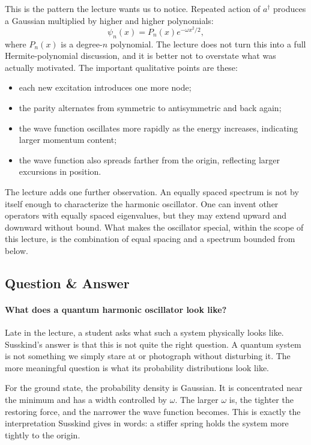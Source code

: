 This is the pattern the lecture wants us to notice. Repeated action of \(a^{\dagger}\) produces a Gaussian multiplied by higher and higher polynomials:
\begin{equation}
\psi_{n}(x)=P_{n}(x)e^{-\omega x^{2}/2},
\end{equation}
where \(P_{n}(x)\) is a degree-\(n\) polynomial. The lecture does not turn this into a full Hermite-polynomial discussion, and it is better not to overstate what was actually motivated. The important qualitative points are these:
\begin{itemize}
\item each new excitation introduces one more node;
\item the parity alternates from symmetric to antisymmetric and back again;
\item the wave function oscillates more rapidly as the energy increases, indicating larger momentum content;
\item the wave function also spreads farther from the origin, reflecting larger excursions in position.
\end{itemize}

The lecture adds one further observation. An equally spaced spectrum is not by itself enough to characterize the harmonic oscillator. One can invent other operators with equally spaced eigenvalues, but they may extend upward and downward without bound. What makes the oscillator special, within the scope of this lecture, is the combination of equal spacing and a spectrum bounded from below.

\subsection{Question \& Answer}

\paragraph{What does a quantum harmonic oscillator look like?}

Late in the lecture, a student asks what such a system physically looks like. Susskind's answer is that this is not quite the right question. A quantum system is not something we simply stare at or photograph without disturbing it. The more meaningful question is what its probability distributions look like.

For the ground state, the probability density is Gaussian. It is concentrated near the minimum and has a width controlled by \(\omega\). The larger \(\omega\) is, the tighter the restoring force, and the narrower the wave function becomes. This is exactly the interpretation Susskind gives in words: a stiffer spring holds the system more tightly to the origin.

